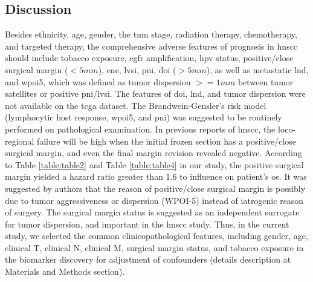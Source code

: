 \documentclass[jpm,article,submit,moreauthors,pdftex]{Definitions/mdpi}
\begin{document}
\begin{paracol}{2}
\linenumbers
\switchcolumn




\section{Discussion}


Besides ethnicity, age, gender, the \acrshort{tnm} stage, radiation therapy, chemotherapy, and targeted therapy, the comprehensive adverse features of prognosis in \acrshort{hnscc} should include tobacco exposure, \acrshort{egfr} amplification, \acrfull{hpv} status, positive/close surgical margin ($<5 mm$), \acrfull{ene}, \acrfull{lvsi}, \acrfull{pni}, \acrfull{doi} ($>5 mm$), as well as metastatic \acrfull{lnd}\cite{Cheraghlou2018}, and \acrfull{wpoi5}, which was defined as tumor dispersion $>= 1 mm$ between tumor satellites or positive \acrshort{pni}/\acrshort{lvsi}\cite{Amin2017}.
The features of \acrshort{doi}, \acrshort{lnd}, and tumor dispersion were not available on the \acrshort{tcga} dataset. The Brandwein-Gensler's risk model (lymphocytic host response, \acrshort{wpoi5}, and \acrshort{pni})\cite{Brandwein-Gensler2010}\cite{Sinha2018} was suggested to be routinely performed on pathological examination. In previous reports of \acrshort{hnscc}, the loco-regional failure will be high when the initial frozen section has a positive/close surgical margin, and even the final margin revision revealed negative\cite{Bulbul2019b}.
According to Table \ref{table:table2} and Table \ref{table:table4} in our study, the positive surgical margin yielded a hazard ratio greater than 1.6 to influence on patient's \acrshort{os}.
It was suggested by authors \cite{Scholl1986}\cite{Sutton2003}\cite{Shaw2004}\cite{Guillemaud2010a}\cite{Patel2010}\cite{Kuriakose2017}\cite{Shapiro2017}\cite{Saidak2018}\cite{Miguelanez-Medran2019}\cite{Saidak2019} that the reason of positive/close surgical margin is possibly due to tumor aggressiveness or dispersion (WPOI-5) instead of iatrogenic reason of surgery. The surgical margin status is suggested as an independent surrogate for tumor dispersion, and important in the \acrshort{hnscc} study. Thus, in the current study, we selected the common clinicopathological features, including gender, age, clinical T, clinical N, clinical M, surgical margin status, and tobacco exposure in the biomarker discovery for adjustment of confounders (details description at Materials and Methods section).


\end{paracol}
\end{document}

